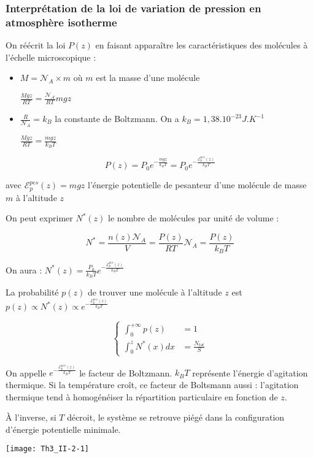 \documentclass[a4paper,12pt]{book}
\begin{document}
\subsubsection{Interprétation de la loi de variation de pression en atmosphère isotherme}
On réécrit la loi $P(z)$ en faisant apparaître les caractéristiques des molécules à l'échelle microscopique :\begin{itemize}
\item $M=\mathcal{N}_A\times m$ où $m$ est la masse d'une molécule
\par $\frac{Mgz}{RT}=\frac{\mathcal{N_A}}{RT}mgz$
\item $\frac{R}{\mathcal{N}_A}=k_B$ la constante de Boltzmann. On a $k_B=1,38.10^{-23} J.K^{-1}$
\par $\frac{Mgz}{RT} = \frac{mgz}{k_BT}$
\end{itemize}
$$ P(z) = P_0e^{-\frac{mgz}{k_BT}} = P_0e^{-\frac{\mathcal{E}_p^{pes}(z)}{k_BT}}$$
\par avec $\mathcal{E}_p^{pes}(z)=mgz$ l'énergie potentielle de pesanteur d'une molécule de masse $m$ à l'altitude $z$
\par On peut exprimer $N^*(z)$ le nombre de molécules par unité de volume :
\par $$ N^* = \frac{n(z)\mathcal{N}_A}{V} = \frac{P(z)}{RT}\mathcal{N}_A = \frac{P(z)}{k_BT}$$
\par On aura : $N^*(z)=\frac{P_0}{k_BT}e^{-\frac{\mathcal{E}_p^{pes}(z)}{k_BT}}$
\par La probabilité $p(z)$ de trouver une molécule à l'altitude $z$ est $p(z)\propto N^*(z)\propto e^{-\frac{\mathcal{E}_p^{pes}(z)}{k_BT}}$
\par $$\left\{\begin{array}{lr} \int_0^{+\infty}p(z) & = 1 \\ \int_0^z N^*(x)dx & = \frac{N_{tot}}{S}\end{array}\right.$$
\par On appelle $e^{-\frac{\mathcal{E}_p^{pes}(z)}{k_BT}}$ le facteur de Boltzmann. $k_BT$ représente l'énergie d'agitation thermique. Si la température croît, ce facteur de Boltsmann aussi : l'agitation thermique tend à homogénéiser la répartition particulaire en fonction de $z$.
\par À l'inverse, si $T$ décroit, le système se retrouve piégé dans la configuration d'énergie potentielle minimale.
\par\texttt{[image: Th3\_II-2-1]}
\end{document}
